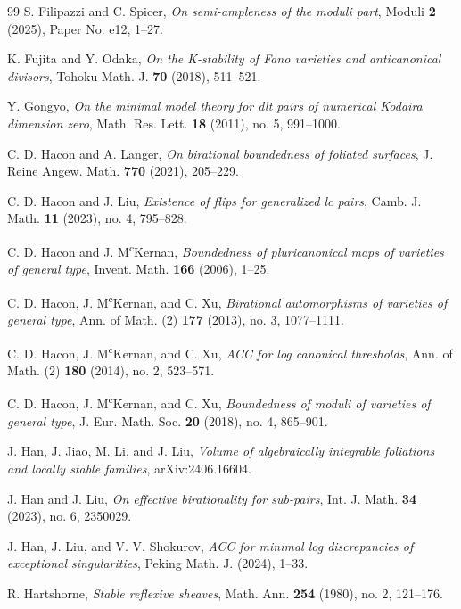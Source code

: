 \documentclass[11pt,reqno]{amsart}
\numberwithin{equation}{section}
\theoremstyle{definition}
\begin{document}
\begin{thebibliography}{99}
 S. Filipazzi and C. Spicer, \textit{On semi-ampleness of the moduli part}, Moduli \textbf{2} (2025), Paper No. e12, 1--27.

 K. Fujita and Y. Odaka, \textit{On the K-stability of Fano varieties and anticanonical divisors}, Tohoku Math. J. \textbf{70} (2018), 511--521.

 Y. Gongyo, \textit{On the minimal model theory for dlt pairs of numerical Kodaira dimension zero}, Math. Res. Lett. \textbf{18} (2011), no. 5, 991--1000.

 C. D. Hacon and A. Langer, \textit{On birational boundedness of foliated surfaces}, J. Reine Angew. Math. \textbf{770} (2021), 205--229.

 C. D. Hacon and J. Liu, \textit{Existence of flips for generalized lc pairs}, Camb. J. Math. \textbf{11} (2023), no. 4, 795--828.

 C. D. Hacon and J. M\textsuperscript{c}Kernan, \textit{Boundedness of pluricanonical maps of varieties of general type}, Invent. Math. \textbf{166} (2006), 1--25.

 C. D. Hacon, J. M\textsuperscript{c}Kernan, and C. Xu, \textit{Birational automorphisms of varieties of general type}, Ann. of Math. (2) \textbf{177} (2013), no. 3, 1077--1111.

 C. D. Hacon, J. M\textsuperscript{c}Kernan, and C. Xu, \textit{ACC for log canonical thresholds}, Ann. of Math. (2) \textbf{180} (2014), no. 2, 523--571.

 C. D. Hacon, J. M\textsuperscript{c}Kernan, and C. Xu, \textit{Boundedness of moduli of varieties of general type}, J. Eur. Math. Soc. \textbf{20} (2018), no. 4, 865--901.

 J. Han, J. Jiao, M. Li, and J. Liu, \textit{Volume of algebraically integrable foliations and locally stable families}, arXiv:2406.16604.

 J. Han and J. Liu, \textit{On effective birationality for sub-pairs}, Int. J. Math. \textbf{34} (2023), no. 6, 2350029.

 J. Han, J. Liu, and V. V. Shokurov, \textit{ACC for minimal log discrepancies of exceptional singularities}, Peking Math. J. (2024), 1--33.

 R. Hartshorne, \textit{Stable reflexive sheaves}, Math. Ann. \textbf{254} (1980), no. 2, 121--176.


\end{thebibliography}
\end{document}

